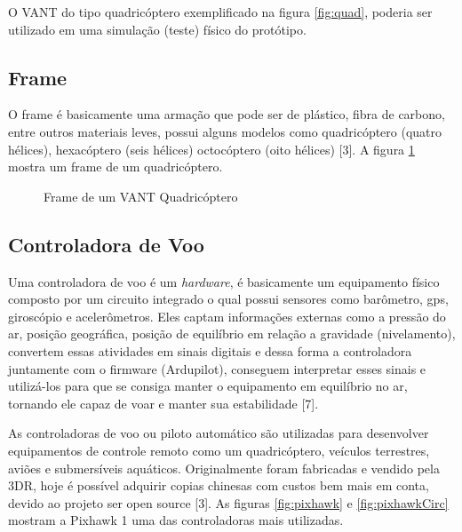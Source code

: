 O VANT do tipo quadricóptero exemplificado na figura \ref{fig:quad}, poderia ser utilizado em uma simulação (teste) físico do protótipo. 
\subsection{Frame}
O frame é basicamente uma armação que pode ser de plástico, fibra de carbono, entre outros materiais leves, possui alguns modelos como quadricóptero (quatro hélices), hexacóptero (seis hélices) octocóptero (oito hélices) [3]. A figura \ref{fig:frame} mostra um frame de um quadricóptero.

\begin{figure}[H]
	\centering
	\caption{Frame de um VANT Quadricóptero}
	\fontsize{9pt}{12pt}\selectfont
	\def\svgwidth{13cm}
	
	\label{fig:frame}
\end{figure}

\subsection{Controladora de Voo}
Uma controladora de voo é um \textit{hardware}, é basicamente um equipamento físico composto por um circuito integrado o qual possui sensores como barômetro, gps, giroscópio e acelerômetros. Eles captam informações externas como a pressão do ar, posição geográfica, posição de equilíbrio em relação a gravidade (nivelamento), convertem essas atividades em sinais digitais e dessa forma a controladora juntamente com o firmware (Ardupilot), conseguem interpretar esses sinais e utilizá-los para que se consiga manter o equipamento em equilíbrio no ar, tornando ele capaz de voar e manter sua estabilidade \cite{sete}[7].  
   
As controladoras de voo ou piloto automático são utilizadas para desenvolver equipamentos de controle remoto como um quadricóptero, veículos terrestres, aviões e submersíveis aquáticos. Originalmente foram fabricadas e vendido pela 3DR, hoje é possível adquirir copias chinesas com custos bem mais em conta, devido ao projeto ser open source [3].
As figuras \ref{fig:pixhawk} e \ref{fig:pixhawkCirc} mostram a Pixhawk 1 uma das controladoras mais utilizadas.

